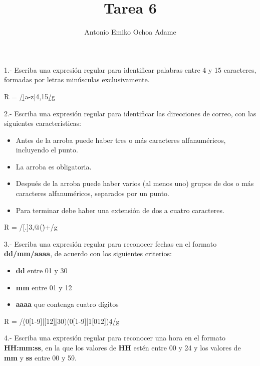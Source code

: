 \documentclass{article}
\begin{document}
\title{Tarea 6}
\author{Antonio Emiko Ochoa Adame}
\maketitle

1.- Escriba una expresión regular para identificar palabras entre 4 y 15
caracteres, formadas por letras minúsculas exclusivamente.

\begin{spverbatim}
R = /\b[a-z]{4,15}\b/g
\end{spverbatim}
\vspace{1em}

2.- Escriba una expresión regular para identificar las direcciones de correo,
con las siguientes características:

\begin{itemize}
	\item
	Antes de la arroba puede haber tres o más caracteres alfanuméricos,
	incluyendo el punto.
	\item
	La arroba es obligatoria.
	\item
	Después de la arroba puede haber varios (al menos uno) grupos de dos o
	más caracteres alfanuméricos, separados por un punto.
	\item
	Para terminar debe haber una extensión de dos a cuatro caracteres.
\end{itemize}

\begin{spverbatim}
R = /[\w.]{3,}@(\.)+/g
\end{spverbatim}
\vspace{1em}

3.- Escriba una expresión regular para reconocer fechas en el formato
\textbf{dd/mm/aaaa}, de acuerdo con los siguientes criterios:

\begin{itemize}
	\item
	\textbf{dd} entre 01 y 30
	\item
	\textbf{mm} entre 01 y 12
	\item
	\textbf{aaaa} que contenga cuatro dígitos
\end{itemize}

\begin{spverbatim}
R = /\b(0[1-9]|[12]\d|30)\/(0[1-9]|1[012])\/\d{4}\b/g
\end{spverbatim}
\vspace{1em}

4.- Escriba una expresión regular para reconocer una hora en el formato
\textbf{HH:mm:ss}, en la que los valores de \textbf{HH} estén entre 00 y 24 y
los valores de \textbf{mm} y \textbf{ss} entre 00 y 59.
\end{document}
